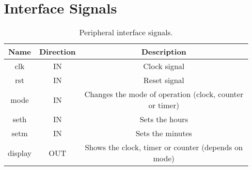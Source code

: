 \section{Interface Signals}

\begin{table}[h!]
\centering
\caption{Peripheral interface signals.}
\sffamily
    \begin{tabular}{|c|c|c|}
        \hline
        
        \textbf{Name} & \textbf{Direction} & \textbf{Description} \\ [0.5ex]
        \hline
        \hline
        
        clk & IN & Clock signal \\
        
        \hline
        rst & IN & Reset signal \\
        \hline
        mode & IN & Changes the mode of operation (clock, counter or timer) \\
        \hline
        seth & IN & Sets the hours \\
        \hline
        setm & IN & Sets the minutes \\
        \hline
        display & OUT & Shows the clock, timer or counter (depends on mode) \\
         \hline
         
    \end{tabular}
\end{table}
\clearpage